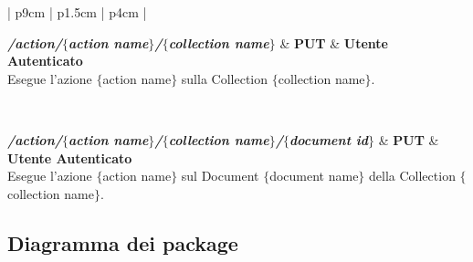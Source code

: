 \begin{center}
\begin{longtable}{| p{9cm} | p{1.5cm} | p{4cm} |}
	 {} \\ \hline
	
	\textbf{\emph{/action/$\{$action name$\}$/$\{$collection name$\}$}} & \textbf{PUT} & \textbf{Utente Autenticato} \\ \hline
	 {Esegue l'azione $\{$action name$\}$ sulla Collection $\{$collection name$\}$.}  \\ 
	\specialrule{1pt}{1pt}{1pt}
	
	 {} \\ \hline
	
	\textbf{\emph{/action/$\{$action name$\}$/$\{$collection name$\}$/$\{$document id$\}$}} & \textbf{PUT} & \textbf{Utente Autenticato} \\ \hline
	 {Esegue l'azione $\{$action name$\}$ sul Document $\{$document name$\}$ della Collection 
	$\{$collection name$\}$.}  \\ 
	\specialrule{1pt}{1pt}{1pt}

	
\end{longtable}
	  \egroup
\end{center}

\subsection{Diagramma dei package}

